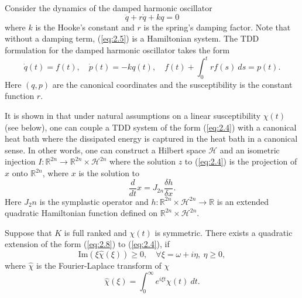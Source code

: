 \begin{example} \label{example:2.1}
Consider the dynamics of the damped harmonic oscillator
\begin{equation} \label{eq:2.5}
	\ddot q + r \dot q + k q = 0
\end{equation}
where $k$ is the Hooke's constant and $r$ is the spring's damping factor. Note that without a damping term, (\ref{eq:2.5}) is a Hamiltonian system. The TDD formulation for the damped harmonic oscillator takes the form
\begin{equation} \label{eq:2.6}
	\dot q(t) = f(t), \quad \dot p(t) = - k q(t), \quad f(t) + \int_0^t r f(s) \ ds = p(t).
\end{equation}
Here $(q,p)$ are the canonical coordinates and the susceptibility is the constant function $r$.
\end{example}

It is shown in \cite{Figotin:2006jy,Figotin:2005} that under natural assumptions on a linear susceptibility $\chi(t)$ (see below), one can couple a TDD system of the form (\ref{eq:2.4}) with a canonical heat bath where the dissipated energy is captured in the heat bath in a canonical sense. In other words, one can construct a Hilbert space $\mathcal H$ and an isometric injection $I:\mathbb R^{2n} \to \mathbb R^{2n}\times \mathcal H^{2n}$ where the solution $z$ to (\ref{eq:2.4}) is the projection of $x$ onto $\mathbb R^{2n}$, where $x$ is the solution to
\begin{equation} \label{eq:2.7}
	\frac{d}{dt} x = J_{2n} \frac{\delta h}{\delta x}.
\end{equation}
Here $J_2n$ is the symplastic operator and $h:\mathbb R^{2n}\times \mathcal H^{2n} \to \mathbb R$ is an extended quadratic Hamiltonian function defined on $\mathbb R^{2n}\times \mathcal H^{2n}$.

\begin{theorem}
Suppose that $K$ is full ranked and $\chi(t)$ is symmetric. There exists a quadratic extension of the form (\ref{eq:2.8}) to (\ref{eq:2.4}), if
\begin{equation} \label{eq:2.8}
	\text{Im}(\xi\hat{\chi}(\xi)) \geq 0, \quad \forall \xi = \omega + i\eta, \ \eta \geq 0,
\end{equation}
where $\hat{\chi}$ is the Fourier-Laplace transform of $\chi$
\begin{equation} \label{eq:2.9}
	\hat{\chi}(\xi) = \int_0^\infty e^{i\xi t} \chi(t)\ dt.
\end{equation}
\end{theorem}

